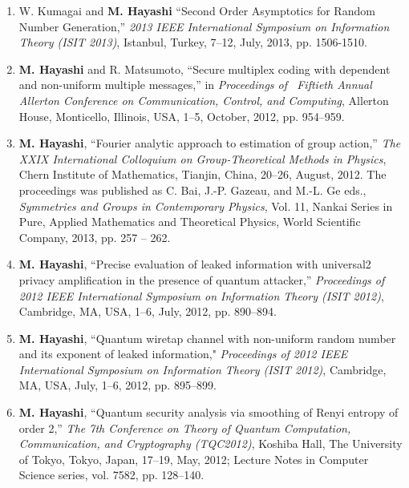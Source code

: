 \documentclass[a4paper,12pt,oneside]{article}
\begin{document}
\begin{enumerate}
    \item
    W. Kumagai and \textbf{M. Hayashi}
    ``Second Order Asymptotics for Random Number Generation,'' 
    {\em 2013 IEEE International Symposium on Information Theory (ISIT 2013)}, 
    Istanbul, Turkey, 7--12, July, 2013, pp. 1506-1510.
    
    \item \textbf{M. Hayashi} and R. Matsumoto, 
    ``Secure multiplex coding with dependent and non-uniform multiple messages,''
    in  \emph{Proceedings of \ Fiftieth Annual Allerton Conference on Communication, Control, and Computing}, 
    Allerton House, Monticello, Illinois, USA, 1--5, October, 2012, pp. 954--959.
    
    \item
    \textbf{M. Hayashi}, ``Fourier analytic approach to estimation of group action,'' 
    {\em The XXIX International Colloquium on Group-Theoretical Methods in Physics}, 
    Chern Institute of Mathematics, Tianjin, China, 20--26, August, 2012.
    The proceedings was published as 
    C. Bai, J.-P. Gazeau, and M.-L. Ge eds.,
    {\em Symmetries and Groups in Contemporary Physics},
    Vol. 11, Nankai Series in Pure, Applied Mathematics and Theoretical Physics,
    World Scientific Company, 2013, pp. 257 -- 262.
    
    \item
    \textbf{M. Hayashi}, 
    ``Precise evaluation of leaked information with universal2 privacy amplification in the presence of quantum attacker,'' 
    {\em Proceedings of 2012 IEEE International Symposium on Information Theory (ISIT 2012)}, 
    Cambridge, MA, USA, 1--6, July, 2012, pp. 890--894. 
    
    \item	\textbf{M. Hayashi}, 
    ``Quantum wiretap channel with non-uniform random number and its exponent of leaked information," 
    {\em Proceedings of 2012 IEEE International Symposium on Information Theory (ISIT 2012)}, 
    Cambridge, MA, USA, July, 1--6, 2012, pp. 895--899. 
    
    \item	\textbf{M. Hayashi}, 
    ``Quantum security analysis via smoothing of Renyi entropy of order 2,''
    {\em The 7th Conference on Theory of Quantum Computation, Communication, and Cryptography (TQC2012)}, 
    Koshiba Hall, The University of Tokyo, Tokyo, Japan, 17--19, May, 2012; 
    Lecture Notes in Computer Science series, vol. 7582, pp. 128--140.
    

\end{enumerate}
\end{document}
